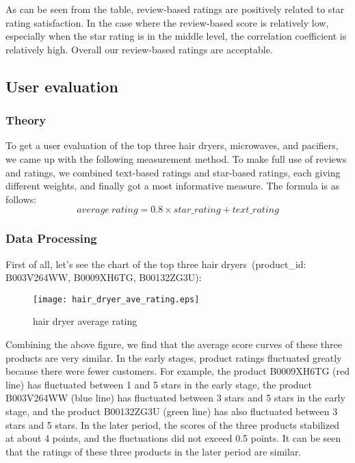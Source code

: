 \documentclass{mcmthesis}
\begin{document}
As can be seen from the table, review-based ratings are positively related to star rating satisfaction. In the case where the review-based score is relatively low, especially when the star rating is in the middle level, the correlation coefficient is relatively high. Overall our review-based ratings are acceptable.


\subsection{User evaluation}
\subsubsection{Theory}
To get a user evaluation of the top three hair dryers, microwaves, and pacifiers, we came up with the following measurement method. To make full use of reviews and ratings, we combined text-based ratings and star-based ratings, each giving different weights, and finally got a most informative measure. The formula is as follows:
$$
average\ rating = 0.8 \times star\_rating + text\_rating
$$

\subsubsection{Data Processing}

First of all, let's see the chart of the top three hair dryers\ (product\_id: B003V264WW, B0009XH6TG, B00132ZG3U):

\begin{figure}[H]
	\small
	\centering
	\texttt{[image: hair\_dryer\_ave\_rating.eps]}
	\caption{hair dryer average rating} \label{fig:hair dryer average rating}
\end{figure}

Combining the above figure, we find that the average score curves of these three products are very similar. In the early stages, product ratings fluctuated greatly because there were fewer customers. For example, the product B0009XH6TG (red line) has fluctuated between 1 and 5 stars in the early stage, the product B003V264WW (blue line) has fluctuated between 3 stars and 5 stars in the early stage, and the product B00132ZG3U (green line) has also fluctuated between 3 stars and 5 stars. In the later period, the scores of the three products stabilized at about 4 points, and the fluctuations did not exceed 0.5 points. It can be seen that the ratings of these three products in the later period are similar.
\end{document}
